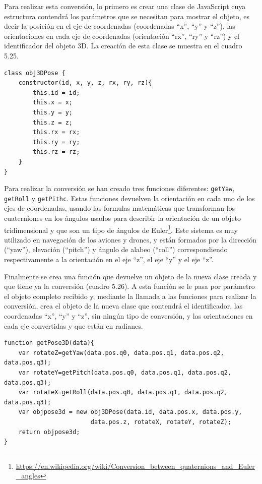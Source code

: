 Para realizar esta conversión, lo primero es crear una clase de JavaScript cuya estructura contendrá los parámetros que se necesitan para mostrar el objeto, es decir la posición en el eje de coordenadas (coordenadas ``x'', ``y'' y ``z''), las orientaciones en cada eje de coordenadas (orientación ``rx'', ``ry'' y ``rz'') y el identificador del objeto 3D. La creación de esta clase se muestra en el cuadro 5.25.

\begin{lstlisting}[caption= Definición de la clase que proporciona la posición de un objeto 3D, label=cod.clasepos]
class obj3DPose {
	constructor(id, x, y, z, rx, ry, rz){
		this.id = id;
		this.x = x;
		this.y = y;
		this.z = z;
		this.rx = rx;
		this.ry = ry;
		this.rz = rz;
	}
}
\end{lstlisting}

Para realizar la conversión se han creado tres funciones diferentes: \texttt{getYaw}, \texttt{getRoll} y \texttt{getPithc}. Estas funciones devuelven la orientación en cada uno de los ejes de coordenadas, usando las formulas matemáticas que transforman los cuaterniones en los ángulos usados para describir la orientación de un objeto tridimensional y que son un tipo de ángulos de Euler\footnote{\url{https://en.wikipedia.org/wiki/Conversion_between_quaternions_and_Euler_angles}}. Este sistema es muy utilizado en navegación de los aviones y drones, y están formados por la dirección (``yaw''), elevación (``pitch'') y ángulo de alabeo (``roll'') correspondiendo respectivamente a la orientación en el eje ``z'', el eje ``y'' y el eje ``z''.

Finalmente se crea una función que devuelve un objeto de la nueva clase creada y que tiene ya la conversión (cuadro 5.26). A esta función se le pasa por parámetro el objeto completo recibido y, mediante la llamada a las funciones para realizar la conversión, crea el objeto de la nueva clase que contendrá el identificador, las coordenadas ``x'', ``y'' y ``z'', sin ningún tipo de conversión, y las orientaciones en cada eje convertidas y que están en radianes.

\begin{lstlisting}[caption= Función que devuelve la posición tras la conversión, label=cod.posicionconvertida]
function getPose3D(data){
	var rotateZ=getYaw(data.pos.q0, data.pos.q1, data.pos.q2, data.pos.q3);
	var rotateY=getPitch(data.pos.q0, data.pos.q1, data.pos.q2, data.pos.q3);
	var rotateX=getRoll(data.pos.q0, data.pos.q1, data.pos.q2, data.pos.q3);
	var objpose3d = new obj3DPose(data.id, data.pos.x, data.pos.y,
						data.pos.z, rotateX, rotateY, rotateZ);
	return objpose3d;
}
\end{lstlisting}

